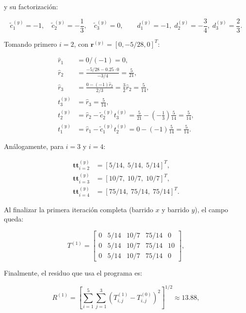 \documentclass[11pt,a4paper]{article}
\begin{document}
y su factorizaci\'on:

\begin{equation}
\tilde c_1^{(y)}=-1,\quad \tilde c_2^{(y)}=-\frac13,\quad \tilde c_3^{(y)}=0,
\qquad
d_1^{(y)}=-1,\; d_2^{(y)}=-\frac34,\; d_3^{(y)}=\frac23.
\end{equation}

Tomando primero \(i=2\), con \(\mathbf r^{(y)}=[0,-5/28,0]^T\):

\begin{equation}
\begin{aligned}
\hat r_1 &= 0/(-1)=0,\\
\hat r_2 &= \frac{-5/28-0.25\cdot0}{-3/4}=\frac{5}{21},\\
\hat r_3 &= \frac{0-(-1)\hat r_2}{2/3}=\frac{3}{2}\hat r_2=\frac{5}{14},\\
t_3^{(y)} &= \hat r_3=\frac{5}{14},\\
t_2^{(y)} &= \hat r_2-\tilde c_2^{(y)}t_3^{(y)}
=\frac{5}{21}-\left(-\frac13\right)\frac{5}{14}=\frac{5}{14},\\
t_1^{(y)} &= \hat r_1-\tilde c_1^{(y)}t_2^{(y)}
=0-(-1)\frac{5}{14}=\frac{5}{14}.
\end{aligned}
\end{equation}

An\'alogamente, para \(i=3\) y \(i=4\):

\begin{equation}
\begin{aligned}
\mathbf{tt}^{(y)}_{i=2} &= [5/14,\;5/14,\;5/14]^T,\\
\mathbf{tt}^{(y)}_{i=3} &= [10/7,\;10/7,\;10/7]^T,\\
\mathbf{tt}^{(y)}_{i=4} &= [75/14,\;75/14,\;75/14]^T.
\end{aligned}
\end{equation}

Al finalizar la primera iteraci\'on completa (barrido \(x\) y barrido \(y\)), el
campo queda:

\begin{equation}
T^{(1)} =
\begin{bmatrix}
0 & 5/14 & 10/7 & 75/14 & 0 \\
0 & 5/14 & 10/7 & 75/14 & 10 \\
0 & 5/14 & 10/7 & 75/14 & 0
\end{bmatrix},
\end{equation}

Finalmente, el residuo que usa el programa es:

\begin{equation}
R^{(1)} =
\left[
\sum_{i=1}^{5}\sum_{j=1}^{3}
\left(T_{i,j}^{(1)}-T_{i,j}^{(0)}\right)^2
\right]^{1/2}
\approx 13.88,
\end{equation}
\end{document}
